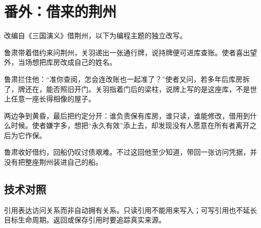 \section{番外：借来的荆州}

改编自《三国演义》借荆州，以下为编程主题的独立改写。

鲁肃带着借约来问荆州，关羽递出一张通行牌，说持牌便可进库查账。使者喜出望外，当场想把库房改成自己的姓名。

鲁肃拦住他：“准你查阅，怎会连改账也一起准了？”使者又问，若多年后库房拆了，牌还在，能否照旧开门。关羽指着门后的梁柱，说牌上写的是这座库，不是世上任意一座长得相像的屋子。

两边争到黄昏，最后把约定分开：谁负责保有库房，谁只读，谁能修改，借用到什么时候。使者嫌字多，想把“永久有效”添上去，却发现没有人愿意在所有者离开之后为它作保。

鲁肃收好借约，回船仍叹讨债艰难。不过这回他至少知道，带回一张访问凭据，并没有把整座荆州装进自己的船。

\subsection*{技术对照}

引用表达访问关系而非自动拥有关系。只读引用不能用来写入；可写引用也不延长目标生命周期。返回或保存引用时要追踪真实来源。

